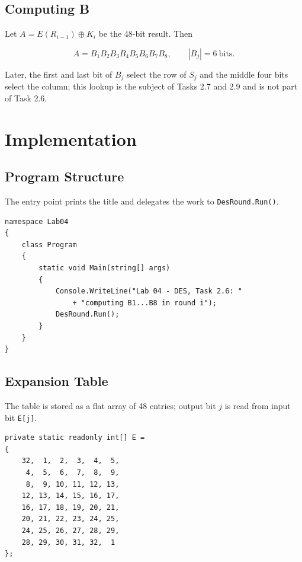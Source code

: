 \documentclass[12pt,a4paper]{article}
\begin{document}
\subsection{Computing B}

Let $A = E(R_{i-1})\oplus K_i$ be the 48-bit result. Then

\begin{equation}
  A = B_1B_2B_3B_4B_5B_6B_7B_8, \qquad |B_j| = 6\ \mathrm{bits}.
\end{equation}

Later, the first and last bit of $B_j$ select the row of $S_j$ and the middle four bits select the column; this lookup is the subject of Tasks 2.7 and 2.9 and is not part of Task 2.6.

\section{Implementation}

\subsection{Program Structure}

The entry point prints the title and delegates the work to \texttt{DesRound.Run()}.

\begin{lstlisting}[style=csharp,caption={Console entry point in Program.cs}]
namespace Lab04
{
    class Program
    {
        static void Main(string[] args)
        {
            Console.WriteLine("Lab 04 - DES, Task 2.6: "
                + "computing B1...B8 in round i");
            DesRound.Run();
        }
    }
}
\end{lstlisting}

\subsection{Expansion Table}

The table is stored as a flat array of 48 entries; output bit $j$ is read from input bit \texttt{E[j]}.

\begin{lstlisting}[style=csharp,caption={Expansion table E}]
private static readonly int[] E =
{
    32,  1,  2,  3,  4,  5,
     4,  5,  6,  7,  8,  9,
     8,  9, 10, 11, 12, 13,
    12, 13, 14, 15, 16, 17,
    16, 17, 18, 19, 20, 21,
    20, 21, 22, 23, 24, 25,
    24, 25, 26, 27, 28, 29,
    28, 29, 30, 31, 32,  1
};
\end{lstlisting}
\end{document}
